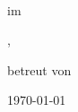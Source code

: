 \begin{center}
  \thispagestyle{empty}

  \vspace*{\fill}

  \Large
  \project \\
  im \semester

  \university, \institute

  \vspace*{5\baselineskip}

  \LARGE
  \textit{\topic}

  \textbf{\artifact}
  \Large

  \vspace*{5\baselineskip}

  \authorsWrapped

  betreut von \supervisors

  \vspace*{3\baselineskip}

  \today
  \normalsize

  \vspace*{\fill}
\end{center}